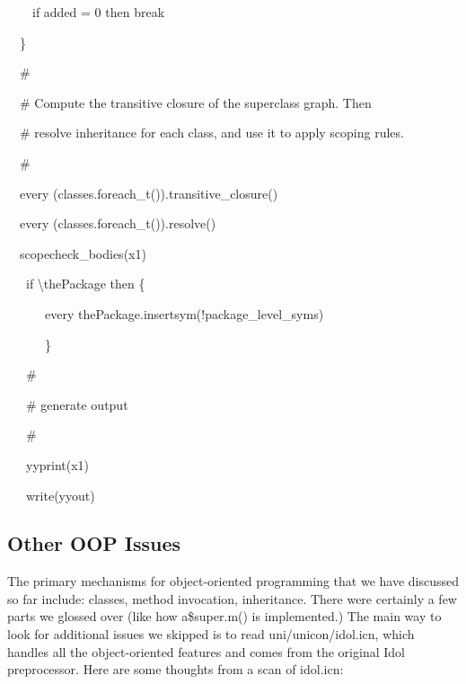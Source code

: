 {\ttfamily\mdseries
\ \ \ \ if added = 0 then break}

{\ttfamily\mdseries
\ \ \}}

{\ttfamily\mdseries
\ \ \#}

{\ttfamily\mdseries
\ \ \# Compute the transitive closure of the superclass graph. Then}

{\ttfamily\mdseries
\ \ \# resolve inheritance for each class, and use it to apply scoping rules.}

{\ttfamily\mdseries
\ \ \#}

{\ttfamily\mdseries
\ \ every (classes.foreach\_t()).transitive\_closure()}

{\ttfamily\mdseries
\ \ every (classes.foreach\_t()).resolve()}


\bigskip

{\ttfamily\mdseries
\ \ scopecheck\_bodies(x1)}


\bigskip

{\ttfamily\mdseries
\ \ \ if {\textbackslash}thePackage then \{}

{\ttfamily\mdseries
\ \ \ \ \ \ every thePackage.insertsym(!package\_level\_syms)}

{\ttfamily\mdseries
\ \ \ \ \ \ \}}


\bigskip

{\ttfamily\mdseries
\ \ \ \#}

{\ttfamily\mdseries
\ \ \ \# generate output}

{\ttfamily\mdseries
\ \ \ \#}

{\ttfamily\mdseries
\ \ \ yyprint(x1)}

{\ttfamily\mdseries
\ \ \ write(yyout)}

\subsection[Other OOP Issues]{Other OOP Issues}

The primary mechanisms for object-oriented programming that we have
discussed so far include: classes, method invocation,
inheritance. There were certainly a few parts we glossed over (like
how a\$super.m() is implemented.) The main way to look for additional
issues we skipped is to read uni/unicon/idol.icn, which handles all
the object-oriented features and comes from the original Idol
preprocessor. Here are some thoughts from a scan of idol.icn:

